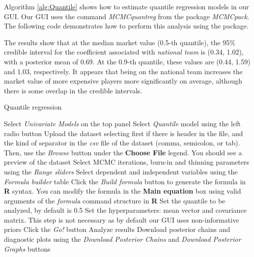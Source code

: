 Algorithm \ref{alg:Quantile} shows how to estimate quantile regression models in our GUI. Our GUI uses the command \textit{MCMCquantreg} from the package \textit{MCMCpack}. The following code demonstrates how to perform this analysis using the package.

The results show that at the median market value (0.5-th quantile), the 95\% credible interval for the coefficient associated with \textit{national team} is (0.34, 1.02), with a posterior mean of 0.69. At the 0.9-th quantile, these values are (0.44, 1.59) and 1.03, respectively. It appears that being on the national team increases the market value of more expensive players more significantly on average, although there is some overlap in the credible intervals.

\begin{algorithm}[h!]
	\caption{Quantile regression}\label{alg:Quantile}
	\begin{algorithmic}[1]  		 			
		\State Select \textit{Univariate Models} on the top panel
		\State Select \textit{Quantile} model using the left radio button
		\State Upload the dataset selecting first if there is header in the file, and the kind of separator in the \textit{csv} file of the dataset (comma, semicolon, or tab). Then, use the \textit{Browse} button under the \textbf{Choose File} legend. You should see a preview of the dataset
		\State Select MCMC iterations, burn-in and thinning parameters using the \textit{Range sliders}
		\State Select dependent and independent variables using the \textit{Formula builder} table
		\State Click the \textit{Build formula} button to generate the formula in \textbf{R} syntax. You can modify the formula in the \textbf{Main equation} box using valid arguments of the \textit{formula} command structure in \textbf{R}
		\State Set the quantile to be analyzed, by default is 0.5
		\State Set the hyperparameters: mean vector and covariance matrix. This step is not necessary as by default our GUI uses non-informative priors
		\State Click the \textit{Go!} button
		\State Analyze results
		\State Download posterior chains and diagnostic plots using the \textit{Download Posterior Chains} and \textit{Download Posterior Graphs} buttons
	\end{algorithmic} 
\end{algorithm}

